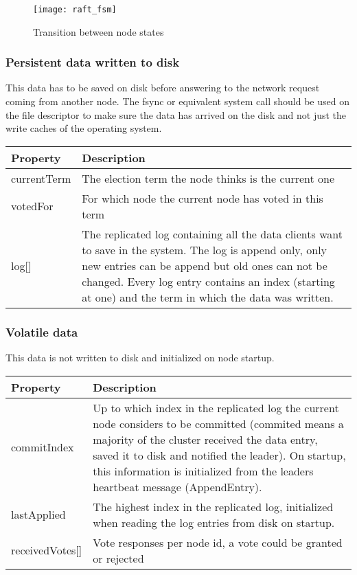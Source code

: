 \begin{figure}
  \captionsetup{labelformat=empty}
  \caption{Transition between node states \cite{fuzzing_raft_for_fun_and_publication} }
  \centering
  \texttt{[image: raft\_fsm]}
  
\end{figure}




\subsubsection*{Persistent data written to disk}

This data has to be saved on disk before answering to the network request coming from another node. The fsync or equivalent system call should be used on the file descriptor to make sure the data has arrived on the disk and not just the write caches of the operating system.

\begin{tabularx}{\textwidth}{ | p{80px} | X | }
\hline
\textbf{Property} & \textbf{Description} \\ \hline
currentTerm & The election term the node thinks is the current one \\ \hline
votedFor & For which node the current node has voted in this term \\ \hline
log[] & The replicated log containing all the data clients want to save in the system. The log is append only, only new entries can be append but old ones can not be changed.
Every log entry contains an index (starting at one) and the term in which the data was written. \\ \hline
\end{tabularx}

\subsubsection*{Volatile data}

This data is not written to disk and initialized on node startup.

\begin{tabularx}{\textwidth}{ | p{80px} | X | }
\hline
\textbf{Property} & \textbf{Description} \\ \hline
commitIndex & Up to which index in the replicated log the current node considers to be committed (commited means a majority of the cluster
received the data entry, saved it to disk and notified the leader). On startup, this information is initialized from the leaders heartbeat message (AppendEntry). \\
\hline
lastApplied & The highest index in the replicated log, initialized when reading the log entries from disk on startup. \\
\hline
receivedVotes[] & Vote responses per node id, a vote could be granted or rejected \\
\hline
\end{tabularx}

